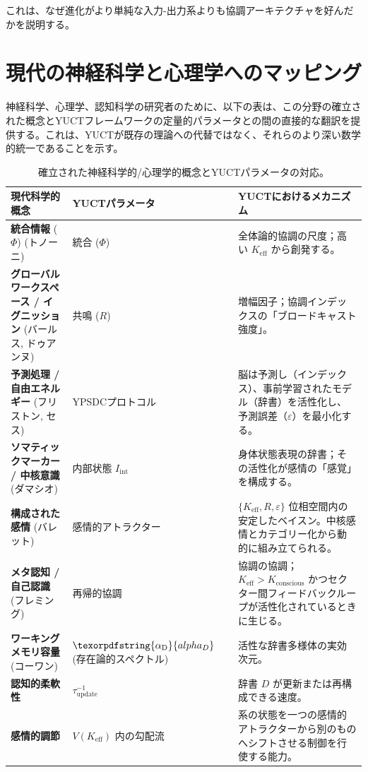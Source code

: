 \documentclass[12pt,a4paper]{article}
\DeclareRobustCommand{\alD}{\texorpdfstring{\ensuremath{\alpha_{\mathrm{D}}}}{alpha_D}}
\begin{document}
	これは、なぜ進化がより単純な入力-出力系よりも協調アーキテクチャを好んだかを説明する。
	
	\section{現代の神経科学と心理学へのマッピング}
	
	神経科学、心理学、認知科学の研究者のために、以下の表は、この分野の確立された概念とYUCTフレームワークの定量的パラメータとの間の直接的な翻訳を提供する。これは、YUCTが既存の理論への代替ではなく、それらのより深い数学的統一であることを示す。
	
	\begin{table}[H]
		\centering
		\caption{確立された神経科学的/心理学的概念とYUCTパラメータの対応。}
		\label{tab:mapping}
		\begin{tabular}{p{4.5cm} p{4cm} p{5cm}}
			\toprule
			\textbf{現代科学的概念} & \textbf{YUCTパラメータ} & \textbf{YUCTにおけるメカニズム} \\
			\midrule
			\textbf{統合情報} (\(\Phi\)) (トノーニ) & 統合 (\(\Phi\)) & 全体論的協調の尺度；高い \(K_{\mathrm{eff}}\) から創発する。 \\
			\textbf{グローバルワークスペース / イグニッション} (バールス, ドゥアンヌ) & 共鳴 (\(R\)) & 増幅因子；協調インデックスの「ブロードキャスト強度」。 \\
			\textbf{予測処理 / 自由エネルギー} (フリストン, セス) & YPSDCプロトコル & 脳は予測し（インデックス）、事前学習されたモデル（辞書）を活性化し、予測誤差（\(\varepsilon\)）を最小化する。 \\
			\textbf{ソマティックマーカー / 中核意識} (ダマシオ) & 内部状態 \(I_{\mathrm{int}}\) & 身体状態表現の辞書；その活性化が感情の「感覚」を構成する。 \\
			\textbf{構成された感情} (バレット) & 感情的アトラクター & \(\{K_{\mathrm{eff}}, R, \varepsilon\}\) 位相空間内の安定したベイスン。中核感情とカテゴリー化から動的に組み立てられる。 \\
			\textbf{メタ認知 / 自己認識} (フレミング) & 再帰的協調 & 協調の協調；\(K_{\mathrm{eff}} > K_{\mathrm{conscious}}\) かつセクター間フィードバックループが活性化されているときに生じる。 \\
			\textbf{ワーキングメモリ容量} (コーワン) & \(\alD\) (存在論的スペクトル) & 活性な辞書多様体の実効次元。 \\
			\textbf{認知的柔軟性} & \(\tau_{\mathrm{update}}^{-1}\) & 辞書 \(D\) が更新または再構成できる速度。 \\
			\textbf{感情的調節} & \(V(K_{\mathrm{eff}})\) 内の勾配流 & 系の状態を一つの感情的アトラクターから別のものへシフトさせる制御を行使する能力。 \\
			\bottomrule
		\end{tabular}
	\end{table}
	
\end{document}
